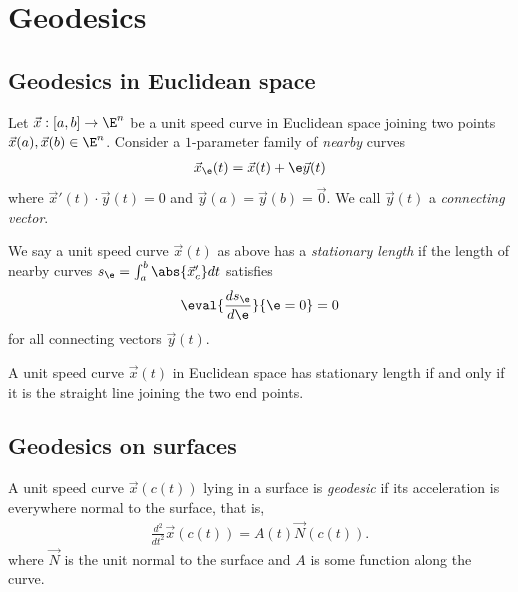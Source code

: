 \documentclass{article}
\begin{document}
\section{Geodesics}

\subsection{Geodesics in Euclidean space}

\begin{definition}
    Let $\vec x:[a,b]\to\E^n$ be a unit speed curve in Euclidean space joining two points 
    $\vec x(a),\vec x(b)\in\E^n$. Consider a $1$-parameter family of \emph{nearby} curves 
    \begin{align*}
        \vec x_\e (t) = \vec x(t) + \e\vec y(t)
    \end{align*}
    where $\vec x'(t) \cdot \vec y(t)  = 0$ and $\vec y(a)=\vec y(b)=\vec 0$.
    We call $\vec y(t)$ a \emph{connecting vector}.
\end{definition}

\begin{definition}
    We say a unit speed curve $\vec x(t)$ as above has a \emph{stationary length} if 
    the length of nearby curves $s_\e = \int_a^b \abs{\vec x'_c} dt$ satisfies 
    \begin{align*}
        \eval{\frac{ds_\e}{d\e }}{\e=0}=0
    \end{align*}
    for all connecting vectors $\vec y(t)$.
\end{definition}

\begin{proposition}
    A unit speed curve $\vec x(t)$ in Euclidean space has stationary length if and only if 
    it is the straight line joining the two end points.
\end{proposition}

\subsection{Geodesics on surfaces}

\begin{definition}
    A unit speed curve $\vec x(c(t))$ lying in a surface is \emph{geodesic} if its acceleration
    is everywhere normal to the surface, that is, 
    \begin{align*}
        \frac{d^2}{dt^2}\vec x(c(t)) = A(t)\vec N(c(t)).
    \end{align*}
    where $\vec N$ is the unit normal to the surface and $A$ is some function along the curve.
\end{definition}
\end{document}
